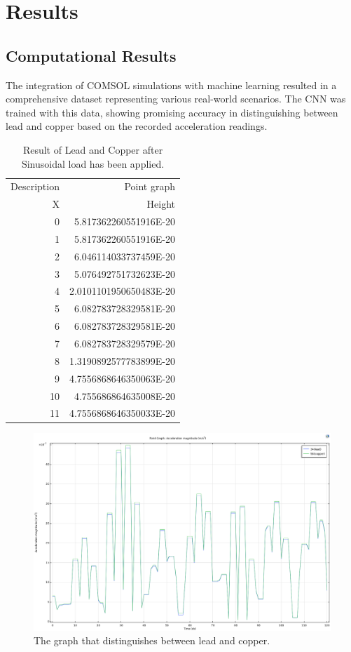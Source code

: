 \chapter{Results}
\noindent
\section{Computational Results}

The integration of COMSOL simulations with machine learning resulted in a comprehensive dataset representing various real-world scenarios. The CNN was trained with this data, showing promising accuracy in distinguishing between lead and copper based on the recorded acceleration readings.


\begin{table}[h]
\centering
\begin{tabular}{|r|r|}
  Description & Point graph\\
  
  X & Height\\
  0 & 5.817362260551916E-20\\
  1 & 5.817362260551916E-20\\
  2 & 6.046114033737459E-20\\
  3 & 5.076492751732623E-20\\
  4 & 2.0101101950650483E-20\\
  5 & 6.082783728329581E-20\\
  6 & 6.082783728329581E-20\\
  7 & 6.082783728329579E-20\\
  8 & 1.3190892577783899E-20\\
  9 & 4.7556868646350063E-20\\
  10 & 4.755686864635008E-20\\
  11 & 4.7556868646350033E-20\\
\end{tabular}

\caption{Result of Lead and Copper after Sinusoidal load has been applied.}
\label{tab:result}
\end{table}



\begin{figure}[t]
  \centering
  \includegraphics[width=0.4\hsize]{./Graph.png}
  \caption{The graph that distinguishes between lead and copper.}
  \label{fig:logo}
\end{figure}

% 				
% 



